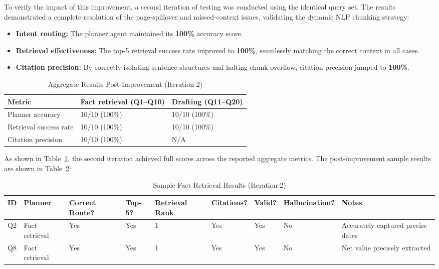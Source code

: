 \documentclass[11pt,a4paper]{article}
\begin{document}
To verify the impact of this improvement, a second iteration of testing was conducted using the identical query set. The results demonstrated a complete resolution of the page-spillover and missed-context issues, validating the dynamic NLP chunking strategy:

\begin{itemize}
\item \textbf{Intent routing:} The planner agent maintained its \textbf{100\%} accuracy score.
\item \textbf{Retrieval effectiveness:} The top-5 retrieval success rate improved to \textbf{100\%}, seamlessly matching the correct context in all cases.
\item \textbf{Citation precision:} By correctly isolating sentence structures and halting chunk overflow, citation precision jumped to \textbf{100\%}.
\end{itemize}

\begin{table}[!ht]
    \centering
    \begin{tabular}{|l|l|l|}
    \hline
        Metric & Fact retrieval (Q1–Q10) & Drafting (Q11–Q20) \\ \hline
        Planner accuracy & 10/10 (100\%) & 10/10 (100\%) \\ \hline
        Retrieval success rate & 10/10 (100\%) & 10/10 (100\%) \\ \hline
        Citation precision & 10/10 (100\%) & N/A \\ \hline
    \end{tabular}
    \caption{Aggregate Results Post-Improvement (Iteration 2)}
    \label{tab:iter2-aggregate}
\end{table}

As shown in Table~\ref{tab:iter2-aggregate}, the second iteration achieved full scores across the reported aggregate metrics. The post-improvement sample results are shown in Table~\ref{tab:iter2-sample-fact-results}:

\begin{table}[H]
    \centering
    \begin{tabularx}{\textwidth}{|l|l|X|X|X|X|X|X|X|}
    \hline
      ID & Planner & Correct Route? & Top-5? & Retrie\-val Rank & Cita\-tions? & Valid? & Hal\-lu\-ci\-na\-tion? & Notes \\ \hline
        Q2 & Fact retrieval & Yes & Yes & 1 & Yes & Yes & No & Accurately captured precise dates \\ \hline
        Q8 & Fact retrieval & Yes & Yes & 1 & Yes & Yes & No & Net value precisely extracted \\ \hline
    \end{tabularx}
    \caption{Sample Fact Retrieval Results (Iteration 2)}
    \label{tab:iter2-sample-fact-results}
\end{table}
\end{document}
